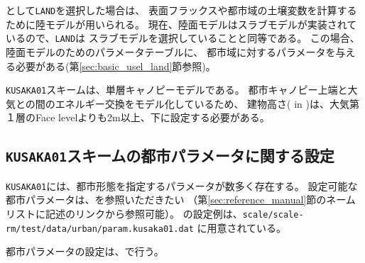 として\verb|LAND|を選択した場合は、
表面フラックスや都市域の土壌変数を計算するために陸モデルが用いられる。
現在、陸面モデルはスラブモデルが実装されているので、\verb|LAND|は
スラブモデルを選択していることと同等である。
この場合、陸面モデルのためのパラメータテーブルに、
都市域に対するパラメータを与える必要がある(第\ref{sec:basic_usel_land}節参照)。

\verb|KUSAKA01|スキームは、単層キャノピーモデルである。
都市キャノピー上端と大気との間のエネルギー交換をモデル化しているため、
建物高さ( in )は、大気第１層のFace levelよりも2m以上、下に設定する必要がある。



\subsection{\texttt{KUSAKA01}スキームの都市パラメータに関する設定}

\verb|KUSAKA01|には、都市形態を指定するパラメータが数多く存在する。
設定可能な都市パラメータは、を参照いただきたい
（第\ref{sec:reference_manual}節のネームリストに記述のリンクから参照可能）。
 の設定例は、\verb|scale/scale-rm/test/data/urban/param.kusaka01.dat| に用意されている。



都市パラメータの設定は、で行う。
%


